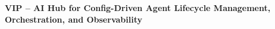 
\begin{center}
    {\fontsize{24}{28}\selectfont\bfseries VIP -- AI Hub for Config-Driven Agent Lifecycle Management, Orchestration, and Observability \par}
\end{center}
\vspace{1cm}


